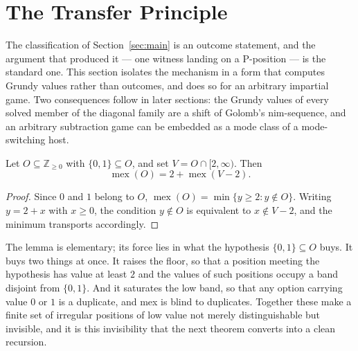 \section{The Transfer Principle}\label{sec:transfer}

The classification of Section~\ref{sec:main} is an outcome statement, and
the argument that produced it --- one witness landing on a P-position ---
is the standard one. This section isolates the mechanism in a form that
computes Grundy values rather than outcomes, and does so for an arbitrary
impartial game. Two consequences follow in later sections: the Grundy
values of every solved member of the diagonal family are a shift of
Golomb's nim-sequence, and an arbitrary subtraction game can be embedded
as a mode class of a mode-switching host.

\begin{lemma}[Absorption]\label{lem:absorption}
Let $O \subseteq \mathbb{Z}_{\ge 0}$ with $\{0, 1\} \subseteq O$, and set
$V = O \cap [2, \infty)$. Then
\[ \operatorname{mex}(O) = 2 + \operatorname{mex}(V - 2). \]
\end{lemma}
\begin{proof}
Since $0$ and $1$ belong to $O$,
$\operatorname{mex}(O) = \min\{y \ge 2 : y \notin O\}$. Writing
$y = 2 + x$ with $x \ge 0$, the condition $y \notin O$ is equivalent to
$x \notin V - 2$, and the minimum transports accordingly.
\end{proof}

The lemma is elementary; its force lies in what the hypothesis
$\{0,1\} \subseteq O$ buys. It buys two things at once. It raises the
floor, so that a position meeting the hypothesis has value at least $2$
and the values of such positions occupy a band disjoint from
$\{0, 1\}$. And it saturates the low band, so that any option carrying
value $0$ or $1$ is a duplicate, and mex is blind to duplicates. Together
these make a finite set of irregular positions of low value not merely
distinguishable but invisible, and it is this invisibility that the next
theorem converts into a clean recursion.


